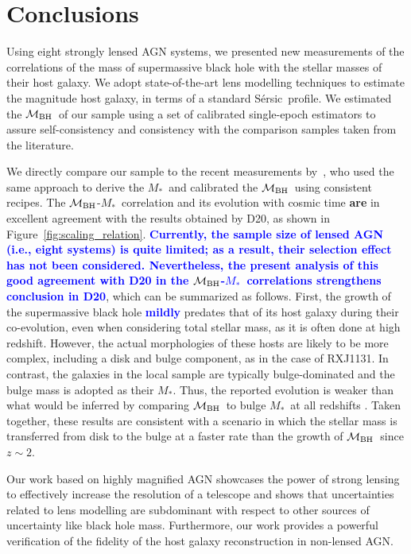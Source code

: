 \documentclass[fleqn,usenatbib]{mnras}
\newcommand{\mbh}{$\mathcal M_{\rm BH}$}
\newcommand{\sersic}{S\'ersic}
\newcommand{\mstar}{{$M_*$}}
\newcommand{\blue}[1]{{\bf \textcolor{blue}{#1}}}
\begin{document}
\section{Conclusions}\label{sec:con}
Using eight strongly lensed AGN systems, we presented new measurements of the correlations of the mass of supermassive black hole with the stellar masses of their host galaxy. We adopt state-of-the-art lens modelling techniques to estimate the magnitude host galaxy, in terms of a standard \sersic\ profile. We estimated the \mbh\ of our sample using a set of calibrated single-epoch estimators to assure self-consistency and consistency with the comparison samples taken from the literature.

We directly compare our sample to the recent measurements by~\citet[][D20]{Ding2020a}, who used the same approach to derive the \mstar\ and calibrated the \mbh\ using consistent recipes. The \mbh-\mstar\ correlation and its evolution with cosmic time {\bf are} in excellent agreement with the results obtained by D20, as shown in Figure~\ref{fig:scaling_relation}. \blue{Currently, the sample size of lensed AGN (i.e., eight systems) is quite limited; as a result, their selection effect has not been considered. Nevertheless, the present analysis of this good agreement with D20 in the \mbh-\mstar\ correlations strengthens conclusion in D20}, which can be summarized as follows. First, the growth of the supermassive black hole \blue{mildly} predates that of its host galaxy during their co-evolution, even when considering total stellar mass, as it is often done at high redshift. However, the actual morphologies of these hosts are likely to be more complex, including a disk and bulge component, as in the case of  RXJ1131. In contrast, the galaxies in the local sample are typically bulge-dominated and the bulge mass is adopted as their  \mstar. Thus, the reported evolution is weaker than what would be inferred by comparing \mbh\ to bulge \mstar\ at all redshifts \citep{Bennert++2011}. Taken together, these results are consistent with a scenario in which the stellar mass is transferred from disk to the bulge at a faster rate than the growth of \mbh\ since $z\sim2$.

Our work based on highly magnified AGN showcases the power of strong lensing to effectively increase the resolution of a telescope and shows that uncertainties related to lens modelling are subdominant with respect to other sources of uncertainty like black hole mass. Furthermore, our work provides a powerful verification of the fidelity of the host galaxy reconstruction in non-lensed AGN. 
\end{document}
